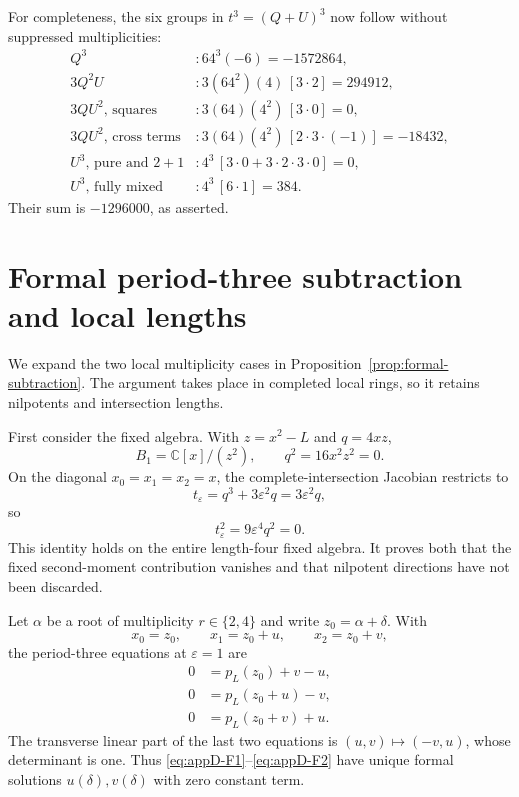 \documentclass[11pt]{article}
\theoremstyle{definition}
\newcommand{\C}{\mathbb C}
\begin{document}
For completeness, the six groups in $t^3=(Q+U)^3$ now follow without suppressed multiplicities:
\begin{align*}
Q^3 &: 64^3(-6)=-1572864,\\
3Q^2U &: 3(64^2)(4)\,[3\cdot2]=294912,\\
3QU^2\text{, squares} &:3(64)(4^2)\,[3\cdot0]=0,\\
3QU^2\text{, cross terms} &:3(64)(4^2)\,[2\cdot3\cdot(-1)]=-18432,\\
U^3\text{, pure and }2+1 &:4^3\,[3\cdot0+3\cdot2\cdot3\cdot0]=0,\\
U^3\text{, fully mixed} &:4^3\,[6\cdot1]=384.
\end{align*}
Their sum is $-1296000$, as asserted.

\section{Formal period-three subtraction and local lengths}
\label{app:local-length}

We expand the two local multiplicity cases in Proposition~\ref{prop:formal-subtraction}. The argument takes place in completed local rings, so it retains nilpotents and intersection lengths.

First consider the fixed algebra. With $z=x^2-L$ and $q=4xz$,
\[
B_1=\C[x]/(z^2),
\qquad
q^2=16x^2z^2=0.
\]
On the diagonal $x_0=x_1=x_2=x$, the complete-intersection Jacobian restricts to
\[
t_\varepsilon=q^3+3\varepsilon^2q=3\varepsilon^2q,
\]
so
\[
t_\varepsilon^2=9\varepsilon^4q^2=0.
\]
This identity holds on the entire length-four fixed algebra. It proves both that the fixed second-moment contribution vanishes and that nilpotent directions have not been discarded.

Let $\alpha$ be a root of multiplicity $r\in\{2,4\}$ and write $z_0=\alpha+\delta$. With
\[
x_0=z_0,
\qquad
x_1=z_0+u,
\qquad
x_2=z_0+v,
\]
the period-three equations at $\varepsilon=1$ are
\begin{align}
0&=p_L(z_0)+v-u,
\label{eq:appD-F0}\\
0&=p_L(z_0+u)-v,
\label{eq:appD-F1}\\
0&=p_L(z_0+v)+u.
\label{eq:appD-F2}
\end{align}
The transverse linear part of the last two equations is $(u,v)\mapsto(-v,u)$, whose determinant is one. Thus \eqref{eq:appD-F1}--\eqref{eq:appD-F2} have unique formal solutions $u(\delta),v(\delta)$ with zero constant term.
\end{document}
